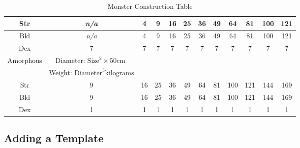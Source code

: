 \documentclass[twoside]{book}
\begin{document}
\begin{table}[htb]
\begin{center}
\begin{tabular}{|c|c|c|c|c|c|c|c|c|c|c|c|}
\hline

 Str &
                    \textit{n/a}
                  & 4 & 9 & 16 & 25 & 36 & 49 & 64 & 81 & 100 & 121 \\

\hline

 Bld &
                    \textit{n/a}
                  & 4 & 9 & 16 & 25 & 36 & 49 & 64 & 81 & 100 & 121 \\

\hline

 Dex & 7 & 7 & 7 & 7 & 7 & 7 & 7 & 7 & 7 & 7 & 7 \\

\hline

 Amorphous &  Diameter: \begin{math}  
                        {\textrm{Size}}^{ 2 }   \times   50 \textrm{cm
                          }  \end{math}
                  \\

\hline

& Weight: \begin{math}  
                        {\textrm{Diameter}}^{ 3 }  \textrm{kilograms}  \end{math}  
                  \\

\hline

 Str & 9 & 16 & 25 & 36 & 49 & 64 & 81 & 100 & 121 & 144 & 169 \\

\hline

 Bld & 9 & 16 & 25 & 36 & 49 & 64 & 81 & 100 & 121 & 144 & 169 \\

\hline

 Dex & 1 & 1 & 1 & 1 & 1 & 1 & 1 & 1 & 1 & 1 & 1 \\

\hline


  \end{tabular}
  
\caption{Monster Construction Table}
  
  \end{center}
\end{table}
  
    

\subsection{Adding a Template}
    
\end{document}
